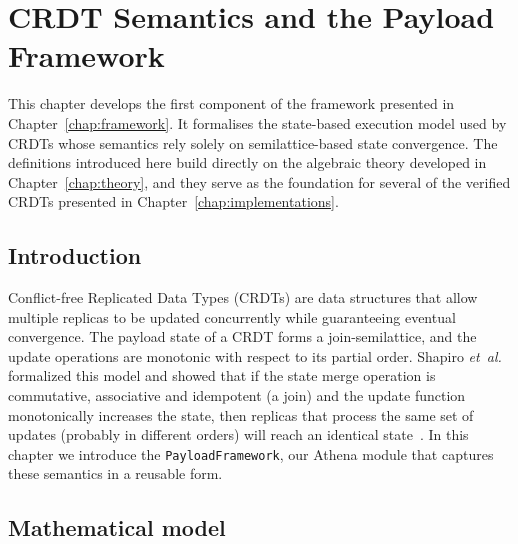 
\chapter{CRDT Semantics and the Payload Framework}\label{chap:payload}

This chapter develops the first component of the framework presented in Chapter~\ref{chap:framework}. It formalises the state-based execution model used by CRDTs whose semantics rely solely on semilattice-based state convergence. The definitions introduced here build directly on the algebraic theory developed in Chapter~\ref{chap:theory}, and they serve as the foundation for several of the verified CRDTs presented in Chapter~\ref{chap:implementations}. %

\section{Introduction}

Conflict-free Replicated Data Types (CRDTs) are data structures that allow multiple replicas to be updated concurrently while guaranteeing eventual convergence. The payload state of a CRDT forms a join-semilattice, and the update operations are monotonic with respect to its partial order. Shapiro \emph{et~al.} formalized this model and showed that if the state merge operation is commutative, associative and idempotent (a join) and the update function monotonically increases the state, then replicas that process the same set of updates (probably in different orders) will reach an identical state~\cite{shapiro2011conflict}. In this chapter we introduce the \texttt{PayloadFramework}, our Athena module that captures these semantics in a reusable form.

\section{Mathematical model}\label{sec:payload-math}

